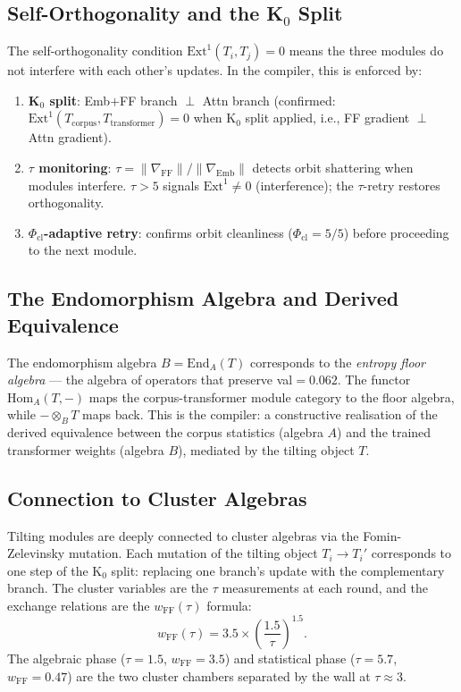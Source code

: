 \documentclass[11pt]{amsart}
\begin{document}
\subsection{Self-Orthogonality and the K\texorpdfstring{$_0$}{0} Split}

The self-orthogonality condition $\mathrm{Ext}^1(T_i, T_j) = 0$
means the three modules do not interfere with each other's updates.
In the compiler, this is enforced by:

\begin{enumerate}
\item \textbf{K$_0$ split}: Emb$+$FF branch $\perp$ Attn branch
  (confirmed: $\mathrm{Ext}^1(T_\mathrm{corpus}, T_\mathrm{transformer}) = 0$
  when K$_0$ split applied, i.e., FF gradient $\perp$ Attn gradient).

\item \textbf{$\tau$ monitoring}: $\tau = \|\nabla_\mathrm{FF}\| / \|\nabla_\mathrm{Emb}\|$
  detects orbit shattering when modules interfere.
  $\tau > 5$ signals $\mathrm{Ext}^1 \neq 0$ (interference); the $\tau$-retry
  restores orthogonality.

\item \textbf{$\Phi_\mathrm{cl}$-adaptive retry}: confirms orbit cleanliness
  ($\Phi_\mathrm{cl} = 5/5$) before proceeding to the next module.
\end{enumerate}

\subsection{The Endomorphism Algebra and Derived Equivalence}

The endomorphism algebra $B = \mathrm{End}_A(T)$ corresponds to
the \emph{entropy floor algebra} --- the algebra of operators that
preserve val$=0.062$.
The functor $\mathrm{Hom}_A(T,-) $ maps the corpus-transformer module category
to the floor algebra, while $-\otimes_B T$ maps back.
This is the compiler: a constructive realisation of the derived equivalence
between the corpus statistics (algebra $A$) and the trained transformer weights
(algebra $B$), mediated by the tilting object $T$.

\subsection{Connection to Cluster Algebras}

Tilting modules are deeply connected to cluster algebras via the
Fomin-Zelevinsky mutation.
Each mutation of the tilting object $T_i \to T_i'$ corresponds to
one step of the K$_0$ split: replacing one branch's update with
the complementary branch.
The cluster variables are the $\tau$ measurements at each round,
and the exchange relations are the $w_\mathrm{FF}(\tau)$ formula:
\[
  w_\mathrm{FF}(\tau) = 3.5 \times \left(\frac{1.5}{\tau}\right)^{1.5}.
\]
The algebraic phase ($\tau=1.5$, $w_\mathrm{FF}=3.5$) and
statistical phase ($\tau=5.7$, $w_\mathrm{FF}=0.47$) are the
two cluster chambers separated by the wall at $\tau \approx 3$.
\end{document}
